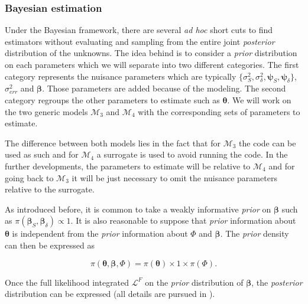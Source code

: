 \documentclass[soumission]{jsfds}
\newcommand{\prior}{\textit{prior }}
\newcommand{\posterior}{\textit{posterior }}
\newcommand{\PB}[1]{\textcolor{green}{PB: #1}}
\begin{document}


\subsubsection{Bayesian estimation}

\noindent Under the Bayesian framework, there are several \textit{ad hoc} short cuts to find estimators without evaluating and sampling from the entire joint 
\posterior distribution of the unknowns. The idea behind is to consider a \prior distribution on each parameters which we will separate into two different categories. The first category represents the nuisance parameters
which are typically $\{\sigma_S^2,\sigma_{\delta}^2,\boldsymbol{\psi}_S,\boldsymbol{\psi}_{\delta}\}$, $\sigma_{err}^2$ and $\boldsymbol{\beta}$. Those parameters are added because of the modeling.
The second category regroups the other parameters to estimate such as $\boldsymbol{\theta}$. We will work on the two generic models
$\mathcal{M}_3$ and $\mathcal{M}_{4}$ with the corresponding sets of parameters to estimate.\newline

The difference between both models lies in the fact that for $\mathcal{M}_3$ the code can be used as such and for $\mathcal{M}_4$ a surrogate is used to avoid running the code. In the further developments, the parameters to estimate will be relative to $\mathcal{M}_4$ and for going back to $\mathcal{M}_3$ it will be just necessary to omit the nuisance parameters relative to the surrogate. \newline


As introduced before, it is common to take a weakly informative \prior on $\boldsymbol{\beta}$ such as $\pi(\boldsymbol{\beta}_S,\boldsymbol{\beta}_{\delta})\propto 1$. It is also reasonable to suppose that \prior information about $\boldsymbol{\theta}$ is independent from the \prior information about $\Phi$ and $\boldsymbol{\beta}$. The \prior density can then be expressed as

\begin{equation}
\pi(\boldsymbol{\theta},\boldsymbol{\beta},\Phi) = \pi(\boldsymbol{\theta}) \times 1 \times \pi(\Phi).
\label{eq:PriorDistribution}
\end{equation}

Once the full likelihood integrated $\mathcal{L}^F$ on the \prior distribution of $\boldsymbol{\beta}$, the \textit{posterior} distribution can be expressed (all details are pursued in \citet{kennedy2001b}).\newline
\end{document}
